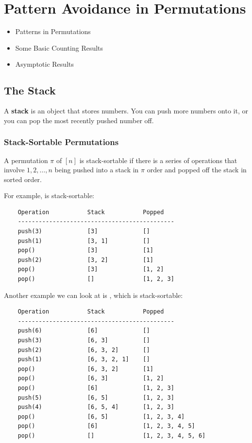\documentclass[letterpaper]{article}
\begin{document}
\newpage 

\section{Pattern Avoidance in Permutations}
\begin{itemize}
    \item Patterns in Permutations 
    \item Some Basic Counting Results 
    \item Asymptotic Results 
\end{itemize}

\subsection{The Stack}
A \textbf{stack} is an object that stores numbers. You can push more numbers onto it, or you can pop the most recently pushed number off. 

\subsubsection{Stack-Sortable Permutations}
\begin{definition}{}{}
    A permutation $\pi$ of $[n]$ is stack-sortable if there is a series of operations that involve $1, 2, \dots, n$ being pushed into a stack in $\pi$ order and popped off the stack in sorted order. 
\end{definition}

For example,  is stack-sortable:
\begin{verbatim}
    Operation           Stack           Popped 
    ---------------------------------------------
    push(3)             [3]             []
    push(1)             [3, 1]          []
    pop()               [3]             [1]
    push(2)             [3, 2]          [1]
    pop()               [3]             [1, 2]
    pop()               []              [1, 2, 3]
\end{verbatim}

Another example we can look at is , which is stack-sortable:
\begin{verbatim}
    Operation           Stack           Popped 
    ---------------------------------------------
    push(6)             [6]             []
    push(3)             [6, 3]          []
    push(2)             [6, 3, 2]       []
    push(1)             [6, 3, 2, 1]    []
    pop()               [6, 3, 2]       [1]
    pop()               [6, 3]          [1, 2]
    pop()               [6]             [1, 2, 3]
    push(5)             [6, 5]          [1, 2, 3]
    push(4)             [6, 5, 4]       [1, 2, 3]
    pop()               [6, 5]          [1, 2, 3, 4]
    pop()               [6]             [1, 2, 3, 4, 5]
    pop()               []              [1, 2, 3, 4, 5, 6]
\end{verbatim}
\end{document}
